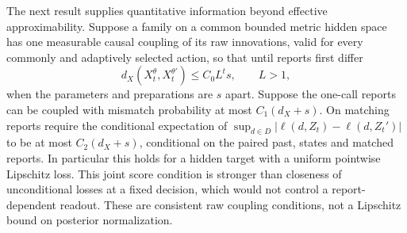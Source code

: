 The next result supplies quantitative information beyond effective approximability. Suppose a family on a common bounded metric hidden space has one measurable causal coupling of its raw innovations, valid for every commonly and adaptively selected action, so that until reports first differ
\begin{equation}\label{eq:expanding}
 d_X(X_t^\theta,X_t^{\theta'})\le C_0 L^t s,\qquad L>1,
\end{equation}
when the parameters and preparations are $s$ apart. Suppose the one-call reports can be coupled with mismatch probability at most $C_1(d_X+s)$. On matching reports require the conditional expectation of $\sup_{d\in D}|\ell(d,Z_t)-\ell(d,Z_t')|$ to be at most $C_2(d_X+s)$, conditional on the paired past, states and matched reports. In particular this holds for a hidden target with a uniform pointwise Lipschitz loss. This joint score condition is stronger than closeness of unconditional losses at a fixed decision, which would not control a report-dependent readout. These are consistent raw coupling conditions, not a Lipschitz bound on posterior normalization.

